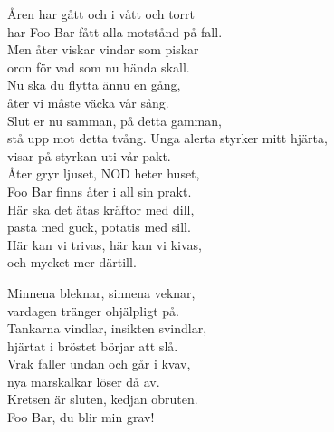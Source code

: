 Åren har gått och i vått och torrt\\
har Foo Bar fått alla motstånd på fall.\\
Men åter viskar vindar som piskar\\
oron för vad som nu hända skall.\\
Nu ska du flytta ännu en gång,\\
åter vi måste väcka vår sång.\\
Slut er nu samman, på detta gamman,\\
stå upp mot detta tvång.
\newpage
Unga alerta styrker mitt hjärta,\\
visar på styrkan uti vår pakt.\\
Åter gryr ljuset, NOD heter huset,\\
Foo Bar finns åter i all sin prakt.\\
Här ska det ätas kräftor med dill,\\
pasta med guck, potatis med sill.\\
Här kan vi trivas, här kan vi kivas,\\
och mycket mer därtill.

Minnena bleknar, sinnena veknar,\\
vardagen tränger ohjälpligt på.\\
Tankarna vindlar, insikten svindlar,\\
hjärtat i bröstet börjar att slå.\\
Vrak faller undan och går i kvav,\\
nya marskalkar löser då av.\\
Kretsen är sluten, kedjan obruten.\\
Foo Bar, du blir min grav!


\\
